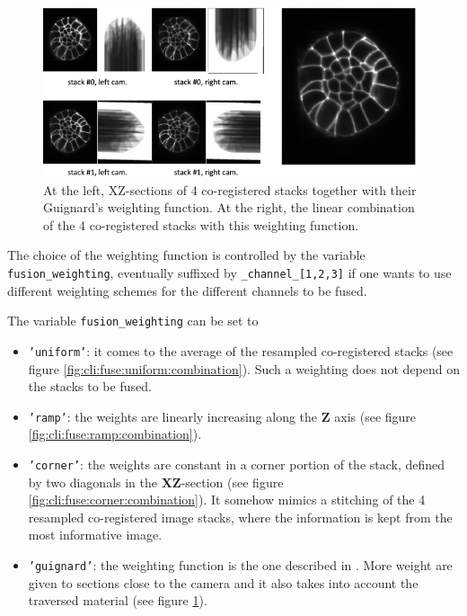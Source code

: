 \begin{figure}
\begin{center}
\includegraphics[height=50mm]{figures/fusion-guignard-combination.png}
\end{center}
\caption{\label{fig:cli:fuse:guignard:combination} At the left, XZ-sections of 4 co-registered stacks together with their Guignard's weighting function.
At the right, the linear combination of the 4 co-registered stacks with this weighting function.}
\end{figure}



The choice of the weighting function is controlled by the variable \texttt{fusion\_weighting}, eventually suffixed by \texttt{\_channel\_[1,2,3]} if one wants to use different weighting schemes for the different channels to be fused.


The variable \texttt{fusion\_weighting} can be set to

\begin{itemize}
\item \texttt{'uniform'}:
it comes to the average of the resampled co-registered stacks (see figure \ref{fig:cli:fuse:uniform:combination}). Such a weighting does not depend on the stacks to be fused.
\item \texttt{'ramp'}:
the weights are linearly increasing along the \textbf{Z} axis (see figure \ref{fig:cli:fuse:ramp:combination}).
\item \texttt{'corner'}: the weights are constant in a corner portion of the stack, defined by two diagonals in the \textbf{XZ}-section (see figure \ref{fig:cli:fuse:corner:combination}). It somehow mimics a stitching of the 4 resampled co-registered image stacks, where the information is kept from the most informative image.
\item \texttt{'guignard'}: 
the weighting function is the one described in \cite{guignard:tel-01278725}.
More weight are given to sections close to the camera and it also takes into account the traversed material (see figure \ref{fig:cli:fuse:guignard:combination}). 
\end{itemize} 

